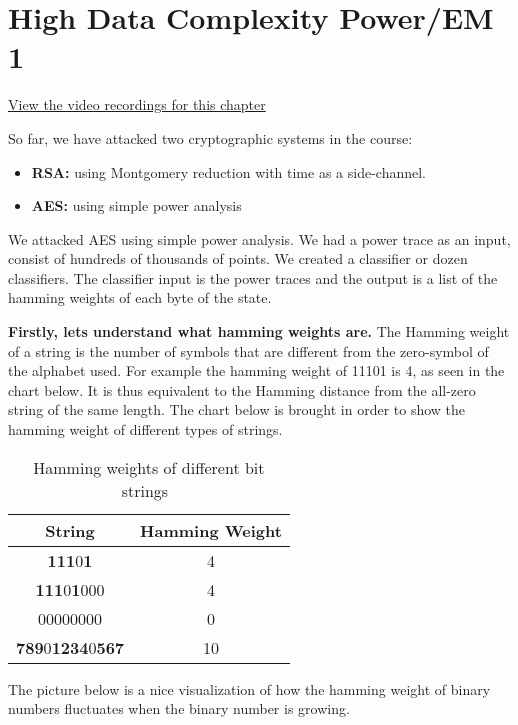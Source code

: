 \chapter{High Data Complexity Power/EM 1} \label{chap:HighDataComplexityPowerEM1}

\href{https://orenlab.sise.bgu.ac.il/AttacksonImplementationsCourseBook/#lecture-7---high-data-complexity-attacks-power-em-i}{View the video recordings for this chapter}


So far, we have attacked two cryptographic systems in the course:
\begin{itemize}
    \item \textbf{RSA:} using Montgomery reduction with time as a side-channel.
    \item \textbf{AES:} using simple power analysis
\end{itemize}

We attacked AES using simple power analysis.
We had a power trace as an input, consist of hundreds of thousands of points.
We created a classifier or dozen classifiers.
The classifier input is the power traces and the output is a list of the hamming weights of each byte of the state.

\textbf{Firstly, lets understand what hamming weights are.}
The Hamming weight of a string is the number of symbols that are different from the zero-symbol of the alphabet used. For example the hamming weight of 11101 is 4, as seen in the chart below. It is thus equivalent to the Hamming distance from the all-zero string of the same length.
The chart below is brought in order to show the hamming weight of different types of strings.

\begin{table}
    \caption{Hamming weights of different bit strings~\cite{hamming}}\label{hammingWeights}
    \begin{center}
    \begin{tabular}{ cc }
        \toprule
        String & Hamming Weight \\ 
        \midrule
        \textbf{111}0\textbf{1} & 4 \\ 
        \textbf{111}0\textbf{1}000 & 4 \\
        00000000 & 0 \\
        \textbf{789}0\textbf{1234}0\textbf{567} & 10 \\
        \bottomrule
    \end{tabular}
    \end{center}
\end{table}
The picture below is a nice visualization of how the hamming weight of binary numbers fluctuates when the binary number is growing.

